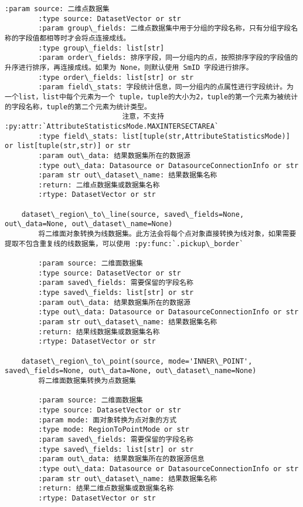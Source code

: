 \documentclass[11pt]{article}
\begin{document}
\begin{Verbatim}[commandchars=\\\{\}]
        :param source: 二维点数据集
        :type source: DatasetVector or str
        :param group\_fields: 二维点数据集中用于分组的字段名称，只有分组字段名称的字段值都相等时才会将点连接成线。
        :type group\_fields: list[str]
        :param order\_fields: 排序字段，同一分组内的点，按照排序字段的字段值的升序进行排序，再连接成线。如果为 None，则默认使用 SmID 字段进行排序。
        :type order\_fields: list[str] or str
        :param field\_stats: 字段统计信息，同一分组内的点属性进行字段统计。为一个list，list中每个元素为一个 tuple，tuple的大小为2，tuple的第一个元素为被统计的字段名称，tuple的第二个元素为统计类型。
                            注意，不支持 :py:attr:`AttributeStatisticsMode.MAXINTERSECTAREA`
        :type field\_stats: list[tuple(str,AttributeStatisticsMode)] or list[tuple(str,str)] or str
        :param out\_data: 结果数据集所在的数据源
        :type out\_data: Datasource or DatasourceConnectionInfo or str
        :param str out\_dataset\_name: 结果数据集名称
        :return: 二维点数据集或数据集名称
        :rtype: DatasetVector or str
    
    dataset\_region\_to\_line(source, saved\_fields=None, out\_data=None, out\_dataset\_name=None)
        将二维面对象转换为线数据集。此方法会将每个点对象直接转换为线对象，如果需要提取不包含重复线的线数据集，可以使用 :py:func:`.pickup\_border`
        
        :param source: 二维面数据集
        :type source: DatasetVector or str
        :param saved\_fields: 需要保留的字段名称
        :type saved\_fields: list[str] or str
        :param out\_data: 结果数据集所在的数据源
        :type out\_data: Datasource or DatasourceConnectionInfo or str
        :param str out\_dataset\_name: 结果数据集名称
        :return: 结果线数据集或数据集名称
        :rtype: DatasetVector or str
    
    dataset\_region\_to\_point(source, mode='INNER\_POINT', saved\_fields=None, out\_data=None, out\_dataset\_name=None)
        将二维面数据集转换为点数据集
        
        :param source: 二维面数据集
        :type source: DatasetVector or str
        :param mode: 面对象转换为点对象的方式
        :type mode: RegionToPointMode or str
        :param saved\_fields: 需要保留的字段名称
        :type saved\_fields: list[str] or str
        :param out\_data: 结果数据集所在的数据源信息
        :type out\_data: Datasource or DatasourceConnectionInfo or str
        :param str out\_dataset\_name: 结果数据集名称
        :return: 结果二维点数据集或数据集名称
        :rtype: DatasetVector or str
    

\end{Verbatim}
\end{document}

